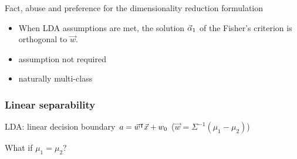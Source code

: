 \begin{frame}
\begin{block}{Fact, abuse and preference for the dimensionality reduction formulation}
\begin{itemize}
\item When LDA assumptions are met, the solution $\vec{\alpha}_1$ of the Fisher's criterion is orthogonal to $\vec{w}$. 
\item assumption not required
\item naturally multi-class
\end{itemize}
\end{block}

\end{frame}

\begin{frame}
\frametitle{Linear separability}

LDA: linear decision boundary $a = \vec{w}^\intercal \vec{x} + w_0$ ($\vec{w} = \Sigma^{-1}(\mu_1-\mu_2)$)
%
\begin{block}{}
\begin{huge}
\centering What if $\mu_1 = \mu_2$? 
\end{huge}
\end{block}
\end{frame}


